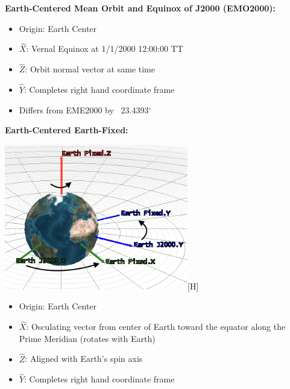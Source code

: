 \documentclass{article}
\begin{document}
\begin{multicols*}{3}
    \textbf{Earth-Centered Mean Orbit and Equinox of J2000 (EMO2000):}
    \begin{itemize}
        \item Origin: Earth Center
        \item $\hat{X}$: Vernal Equinox at 1/1/2000 12:00:00 TT
        \item $\hat{Z}$: Orbit normal vector at same time
        \item $\hat{Y}$: Completes right hand coordinate frame
        \item Differs from EME2000 by ~23.4393$^\circ$
    \end{itemize}
    \newpage
    \textbf{Earth-Centered Earth-Fixed:}\par 
    \includegraphics[width=0.5\linewidth]{Figures/Earth_fixed.png}[H]
    \begin{itemize}
        \item Origin: Earth Center
        \item $\hat{X}$: Osculating vector from center of Earth toward the equator along the Prime Meridian (rotates with Earth)
        \item $\hat{Z}$: Aligned with Earth's spin axis
        \item $\hat{Y}$: Completes right hand coordinate frame
    \end{itemize}


\end{multicols*}
\end{document}
